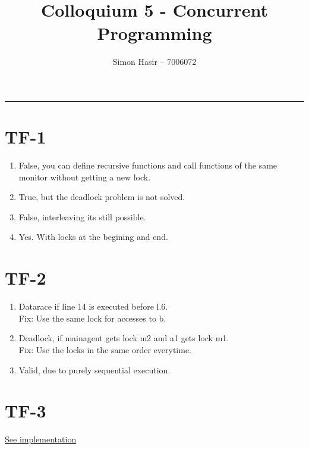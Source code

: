 \documentclass[12pt]{article}
\title{Colloquium 5 - Concurrent Programming}
\author{Simon Hasir -- 7006072}
\begin{document}
    \maketitle
    \noindent
    \rule{\linewidth}{0.4pt}
    
    \section{TF-1}
    \begin{enumerate}[label=(\alph*)]
        \item False, you can define recursive functions and call functions of the same monitor
        without getting a new lock.
        \item True, but the deadlock problem is not solved.
        \item False, interleaving its still possible.
        \item Yes. With locks at the begining and end.
    \end{enumerate}
    \section{TF-2}
    \begin{enumerate}[label=(\alph*)]
        \item Datarace if line 14 is executed before l.6.\\
        Fix: Use the same lock for accesses to b.
        \item Deadlock, if mainagent gets lock m2 and a1 gets lock m1. \\
        Fix: Use the locks in the same order everytime.
        \item Valid, due to purely sequential execution.
    \end{enumerate}
    \section{TF-3}
    \href{https://pseuco.com/#/edit/remote/qsdwbcrf6c970rdrtnmq}{See implementation}
    
\end{document}
